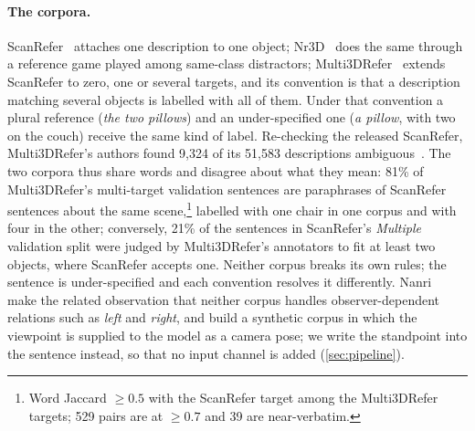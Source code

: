 \paragraph{The corpora.}
ScanRefer~\cite{scanrefer} attaches one description to one object; Nr3D~\cite{referit3d} does the same through a reference game played among same-class distractors; Multi3DRefer~\cite{multi3drefer} extends ScanRefer to zero, one or several targets, and its convention is that a description matching several objects is labelled with all of them. Under that convention a plural reference (\emph{the two pillows}) and an under-specified one (\emph{a pillow}, with two on the couch) receive the same kind of label. Re-checking the released ScanRefer, Multi3DRefer's authors found 9,324 of its 51,583 descriptions ambiguous~\cite{multi3drefer}. The two corpora thus share words and disagree about what they mean: 81\% of Multi3DRefer's multi-target validation sentences are paraphrases of ScanRefer sentences about the same scene,\footnote{Word Jaccard $\ge 0.5$ with the ScanRefer target among the Multi3DRefer targets; 529 pairs are at $\ge 0.7$ and 39 are near-verbatim.} labelled with one chair in one corpus and with four in the other; conversely, 21\% of the sentences in ScanRefer's \emph{Multiple} validation split were judged by Multi3DRefer's annotators to fit at least two objects, where ScanRefer accepts one. Neither corpus breaks its own rules; the sentence is under-specified and each convention resolves it differently. Nanri \etal~\cite{nanri2026viewpoint} make the related observation that neither corpus handles observer-dependent relations such as \emph{left} and \emph{right}, and build a synthetic corpus in which the viewpoint is supplied to the model as a camera pose; we write the standpoint into the sentence instead, so that no input channel is added (\cref{sec:pipeline}).

